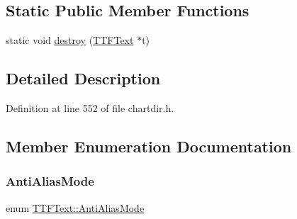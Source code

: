 \subsection*{Static Public Member Functions}
\begin{DoxyCompactItemize}
\item 
static void \hyperlink{class_t_t_f_text_ad656abc050a6d082cf0f07fb5c519253}{destroy} (\hyperlink{class_t_t_f_text}{T\+T\+F\+Text} $\ast$t)
\end{DoxyCompactItemize}


\subsection{Detailed Description}


Definition at line 552 of file chartdir.\+h.



\subsection{Member Enumeration Documentation}
\mbox{\label{class_t_t_f_text_af454c4b75744037f4231f4166b7ae614}} 
\subsubsection{\texorpdfstring{Anti\+Alias\+Mode}{AntiAliasMode}}
{\footnotesize\ttfamily enum \hyperlink{class_t_t_f_text_af454c4b75744037f4231f4166b7ae614}{T\+T\+F\+Text\+::\+Anti\+Alias\+Mode}}

